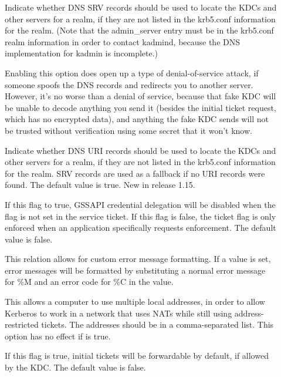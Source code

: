 \documentclass[letterpaper,10pt,english]{sphinxmanual}
\begin{document}
\begin{description}
\item[{}] \leavevmode
Indicate whether DNS SRV records should be used to locate the KDCs
and other servers for a realm, if they are not listed in the
krb5.conf information for the realm.  (Note that the admin\_server
entry must be in the krb5.conf realm information in order to
contact kadmind, because the DNS implementation for kadmin is
incomplete.)

Enabling this option does open up a type of denial-of-service
attack, if someone spoofs the DNS records and redirects you to
another server.  However, it’s no worse than a denial of service,
because that fake KDC will be unable to decode anything you send
it (besides the initial ticket request, which has no encrypted
data), and anything the fake KDC sends will not be trusted without
verification using some secret that it won’t know.

\item[{}] \leavevmode
Indicate whether DNS URI records should be used to locate the KDCs
and other servers for a realm, if they are not listed in the
krb5.conf information for the realm.  SRV records are used as a
fallback if no URI records were found.  The default value is true.
New in release 1.15.

\item[{}] \leavevmode
If this flag to true, GSSAPI credential delegation will be
disabled when the  flag is not set in the
service ticket.  If this flag is false, the 
ticket flag is only enforced when an application specifically
requests enforcement.  The default value is false.

\item[{}] \leavevmode
This relation allows for custom error message formatting.  If a
value is set, error messages will be formatted by substituting a
normal error message for \%M and an error code for \%C in the value.

\item[{}] \leavevmode
This allows a computer to use multiple local addresses, in order
to allow Kerberos to work in a network that uses NATs while still
using address-restricted tickets.  The addresses should be in a
comma-separated list.  This option has no effect if
 is true.

\item[{}] \leavevmode
If this flag is true, initial tickets will be forwardable by
default, if allowed by the KDC.  The default value is false.


\end{description}
\end{document}
